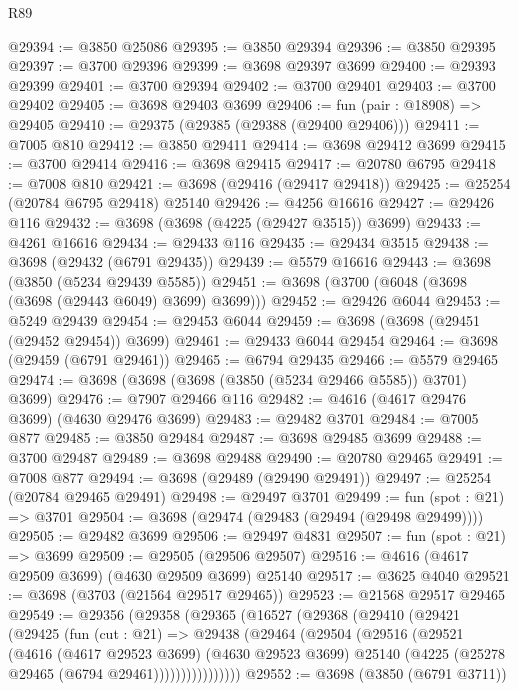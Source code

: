 \begin{lexlean}{R89}
\begin{coremodule}
@29394 := @3850 @25086
@29395 := @3850 @29394
@29396 := @3850 @29395
@29397 := @3700 @29396
@29399 := @3698 @29397 @3699
@29400 := @29393 @29399
@29401 := @3700 @29394
@29402 := @3700 @29401
@29403 := @3700 @29402
@29405 := @3698 @29403 @3699
@29406 := fun (pair : @18908) => @29405
@29410 := @29375 (@29385 (@29388 (@29400 @29406)))
@29411 := @7005 @810
@29412 := @3850 @29411
@29414 := @3698 @29412 @3699
@29415 := @3700 @29414
@29416 := @3698 @29415
@29417 := @20780 @6795
@29418 := @7008 @810
@29421 := @3698 (@29416 (@29417 @29418))
@29425 := @25254 (@20784 @6795 @29418) @25140
@29426 := @4256 @16616
@29427 := @29426 @116
@29432 := @3698 (@3698 (@4225 (@29427 @3515)) @3699)
@29433 := @4261 @16616
@29434 := @29433 @116
@29435 := @29434 @3515
@29438 := @3698 (@29432 (@6791 @29435))
@29439 := @5579 @16616
@29443 := @3698 (@3850 (@5234 @29439 @5585))
@29451 := @3698 (@3700 (@6048 (@3698 (@3698 (@29443 @6049) @3699) @3699)))
@29452 := @29426 @6044
@29453 := @5249 @29439
@29454 := @29453 @6044
@29459 := @3698 (@3698 (@29451 (@29452 @29454)) @3699)
@29461 := @29433 @6044 @29454
@29464 := @3698 (@29459 (@6791 @29461))
@29465 := @6794 @29435
@29466 := @5579 @29465
@29474 := @3698 (@3698 (@3698 (@3850 (@5234 @29466 @5585)) @3701) @3699)
@29476 := @7907 @29466 @116
@29482 := @4616 (@4617 @29476 @3699) (@4630 @29476 @3699)
@29483 := @29482 @3701
@29484 := @7005 @877
@29485 := @3850 @29484
@29487 := @3698 @29485 @3699
@29488 := @3700 @29487
@29489 := @3698 @29488
@29490 := @20780 @29465
@29491 := @7008 @877
@29494 := @3698 (@29489 (@29490 @29491))
@29497 := @25254 (@20784 @29465 @29491)
@29498 := @29497 @3701
@29499 := fun (spot : @21) => @3701
@29504 := @3698 (@29474 (@29483 (@29494 (@29498 @29499))))
@29505 := @29482 @3699
@29506 := @29497 @4831
@29507 := fun (spot : @21) => @3699
@29509 := @29505 (@29506 @29507)
@29516 := @4616 (@4617 @29509 @3699) (@4630 @29509 @3699) @25140
@29517 := @3625 @4040
@29521 := @3698 (@3703 (@21564 @29517 @29465))
@29523 := @21568 @29517 @29465
@29549 := @29356
    (@29358
      (@29365
        (@16527
          (@29368
            (@29410
              (@29421
                (@29425
                  (fun (cut : @21) =>
                  @29438
                    (@29464
                      (@29504
                        (@29516
                          (@29521
                            (@4616
                              (@4617 @29523 @3699)
                              (@4630 @29523 @3699)
                              @25140
                              (@4225 (@25278 @29465 (@6794 @29461))))))))))))))))
@29552 := @3698 (@3850 (@6791 @3711))

\end{coremodule}
\end{lexlean}
